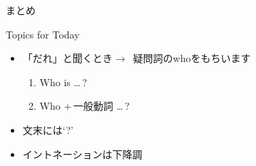 \documentclass[aspectratio=169]{beamer}
\begin{document}
\begin{frame}[plain]{まとめ}
 
\begin{block}{Topics for Today}
\pause
\begin{itemize}\small
 \item 「だれ」と聞くとき$\longrightarrow$\,\,\,疑問詞のwhoをもちいます
        \begin{enumerate}
	 \item Who is \ldots\,?
	 \item Who $+\,\text{一般動詞}$ \ldots\,?
	\end{enumerate}
 \item 文末には`?'
 \item イントネーションは下降調\,\myDownwardPitch{}\,\,
\end{itemize}
     \end{block}

\end{frame}
\end{document}
